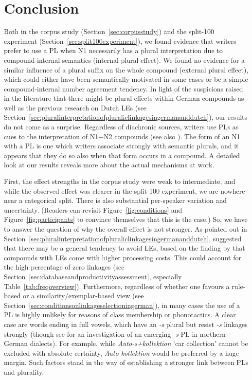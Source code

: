 \section{Conclusion}
\label{sec:conclusion}

Both in the corpus study (Section~\ref{sec:corpusstudy}) and the split-100 experiment (Section~\ref{sec:split100experiment}), we found evidence that writers prefer to use a PL when N1 necessarily has a plural interpretation due to compound-internal semantics (internal plural effect).
We found no evidence for a similar influence of a plural suffix on the whole compound (external plural effect), which could either have been semantically motivated in some cases or be a simple compound-internal number agreement tendency.
In light of the suspicions raised in the literature that there might be plural effects within German compounds as well as the previous research on Dutch LEs (see Section~\ref{sec:pluralinterpretationofpluraliclinkagesingermananddutch}), our results do not come as a surprise.
Regardless of diachronic sources, writers use PLs as cues to the interpretation of N1+N2 compounds (see also \citealt[212]{BangaEa2013b}).
The form of an N1 with a PL is one which writers associate strongly with semantic plurals, and it appears that they do so also when that form occurs in a compound.
A detailed look at our results reveals more about the actual mechanisms at work.

First, the effect strengths in the corpus study were weak to intermediate, and while the observed effect was clearer in the split-100 experiment, we are nowhere near a categorical split.
There is also substantial per-speaker variation and uncertainty.
(Readers can revisit Figure~\ref{fig:conditions} and Figure~\ref{fig:participants} to convince themselves that this is the case.)
So, we have to answer the question of why the overall effect is not stronger.
As pointed out in Section~\ref{sec:pluralinterpretationofpluraliclinkagesingermananddutch}, \textcite[45]{BangaEa2013a} suggested that there may be a general tendency to avoid LEs, based on the finding by \textcite{LibbenEa2002} that compounds with LEs come with higher processing costs.
This could account for the high percentage of zero linkages (see Section~\ref{sec:databaseandproductivityassessment}, especially Table~\ref{tab:freqoverview}).
Furthermore, regardless of whether one favours a rule-based or a similarity\slash exemplar-based view (see Section~\ref{sec:conditionsonlinkageselectioningerman}), in many cases the use of a PL is highly unlikely for reasons of class membership or phonotactics.
A clear case are words ending in full vowels, which have an \textit{-s} plural but resist \textit{-s} linkages strongly (though see \citealt{Fehringer2009} for an investigation of an emerging \textit{-s} PL in northern German dialects).
For example, while \textit{Auto-s+kollektion} `car collection' cannot be excluded with absolute certainty, \textit{Auto-kollektion} would be preferred by a huge margin.
Such factors stand in the way of establishing a stronger link between PLs and plurality.

